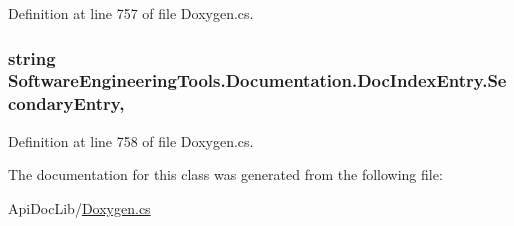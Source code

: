 Definition at line 757 of file Doxygen.\+cs.

\hypertarget{class_software_engineering_tools_1_1_documentation_1_1_doc_index_entry_a0c508fb0b715f0eb8709ed6ba728f0ce}{
\subsubsection[{Secondary\+Entry}]{\setlength{\rightskip}{0pt plus 5cm}string Software\+Engineering\+Tools.\+Documentation.\+Doc\+Index\+Entry.\+Secondary\+Entry\hspace{0.3cm}{\ttfamily [get]}, {\ttfamily [set]}}}\label{class_software_engineering_tools_1_1_documentation_1_1_doc_index_entry_a0c508fb0b715f0eb8709ed6ba728f0ce}


Definition at line 758 of file Doxygen.\+cs.



The documentation for this class was generated from the following file\+:\begin{DoxyCompactItemize}
\item 
Api\+Doc\+Lib/\hyperlink{_doxygen_8cs}{Doxygen.\+cs}\end{DoxyCompactItemize}

